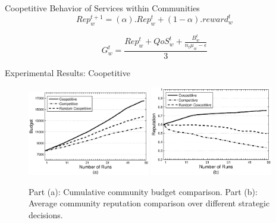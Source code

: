 \documentclass{beamer}
\begin{document}
\begin{frame}{Coopetitive Behavior of Services within Communities}
    \begin{equation*}\label{eq:repreprowthfactor}
        Rep_{w}^{t+1} = (\alpha).Rep_{w}^{t} + (1-\alpha).reward_{w}^{t}
    \end{equation*}

    \begin{equation*}\label{eq:growthfactor}
        G^t_w = \frac{Rep^t_w + QoS_w^t+\frac{B_w^t}{n_t  \mu_w -
        \epsilon}}{3}
    \end{equation*}

\end{frame}


\begin{frame}{Experimental Results: Coopetitive}
    \begin{figure}%
        \includegraphics[width=2.1in]{figures/graphbgtmed.eps}
        \includegraphics[width=2.1in]{figures/graphrep.eps}
        \caption{Part (a): Cumulative community budget comparison. Part
        (b): Average community reputation comparison over different
        strategic decisions.} \label{Graph1}
    \end{figure}
\end{frame}
\end{document}
